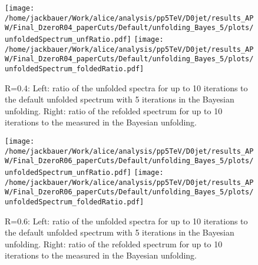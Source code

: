 \begin{figure}[bth]
\centering
\texttt{[image: /home/jackbauer/Work/alice/analysis/pp5TeV/D0jet/results\_APW/Final\_DzeroR04\_paperCuts/Default/unfolding\_Bayes\_5/plots/unfoldedSpectrum\_unfRatio.pdf]}
\texttt{[image: /home/jackbauer/Work/alice/analysis/pp5TeV/D0jet/results\_APW/Final\_DzeroR04\_paperCuts/Default/unfolding\_Bayes\_5/plots/unfoldedSpectrum\_foldedRatio.pdf]}
\caption{R=0.4: Left: ratio of the unfolded spectra for up to 10 iterations to the default unfolded spectrum with 5 iterations in the Bayesian unfolding. Right: ratio of the refolded spectrum for up to 10 iterations to the measured in the Bayesian unfolding. 
}
\label{fig:unfIterations_pp_DzeroR04}
\end{figure}

\begin{figure}[bth]
\centering
\texttt{[image: /home/jackbauer/Work/alice/analysis/pp5TeV/D0jet/results\_APW/Final\_DzeroR06\_paperCuts/Default/unfolding\_Bayes\_5/plots/unfoldedSpectrum\_unfRatio.pdf]}
\texttt{[image: /home/jackbauer/Work/alice/analysis/pp5TeV/D0jet/results\_APW/Final\_DzeroR06\_paperCuts/Default/unfolding\_Bayes\_5/plots/unfoldedSpectrum\_foldedRatio.pdf]}
\caption{R=0.6: Left: ratio of the unfolded spectra for up to 10 iterations to the default unfolded spectrum with 5 iterations in the Bayesian unfolding. Right: ratio of the refolded spectrum for up to 10 iterations to the measured in the Bayesian unfolding. 
}
\label{fig:unfIterations_pp_DzeroR06}
\end{figure}
